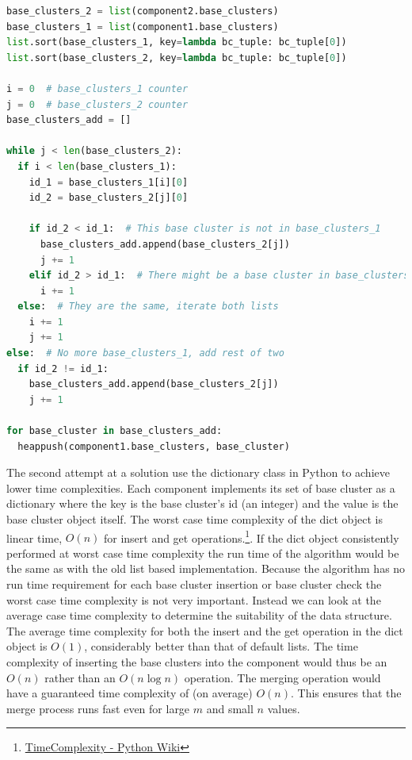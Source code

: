 \begin{lstlisting}[float=ht, language=python, breaklines=true, label=lst:simultaneousmerge, caption={Simultaneous merge of components.}] 
base_clusters_2 = list(component2.base_clusters)
base_clusters_1 = list(component1.base_clusters)
list.sort(base_clusters_1, key=lambda bc_tuple: bc_tuple[0])
list.sort(base_clusters_2, key=lambda bc_tuple: bc_tuple[0])

i = 0  # base_clusters_1 counter
j = 0  # base_clusters_2 counter
base_clusters_add = []

while j < len(base_clusters_2):
  if i < len(base_clusters_1):
    id_1 = base_clusters_1[i][0]
    id_2 = base_clusters_2[j][0]

    if id_2 < id_1:  # This base cluster is not in base_clusters_1
      base_clusters_add.append(base_clusters_2[j])
      j += 1
    elif id_2 > id_1:  # There might be a base cluster in base_clusters_1
      i += 1
  else:  # They are the same, iterate both lists
    i += 1
    j += 1
else:  # No more base_clusters_1, add rest of two
  if id_2 != id_1:
    base_clusters_add.append(base_clusters_2[j])
    j += 1

for base_cluster in base_clusters_add:
  heappush(component1.base_clusters, base_cluster)
\end{lstlisting}
   
The second attempt at a solution use the dictionary class in Python to achieve lower time complexities. Each component implements its set of base cluster as a dictionary where the key is the base cluster's id (an integer) and the value is the base cluster object itself. The worst case time complexity of the dict object is linear time, \(O(n)\) for insert and get operations.\footnote{\href{https://wiki.python.org/moin/TimeComplexity}{TimeComplexity - Python Wiki}}. If the dict object consistently performed at worst case time complexity the run time of the algorithm would be the same as with the old list based implementation. Because the algorithm has no run time requirement for each base cluster insertion or base cluster check the worst case time complexity is not very important. Instead we can look at the average case time complexity to determine the suitability of the data structure. The average time complexity for both the insert and the get operation in the dict object is \(O(1)\), considerably better than that of default lists. The time complexity of inserting the base clusters into the component would thus be an \(O(n)\) rather than an \(O(n \log n)\) operation. The merging operation would have a guaranteed time complexity of (on average) \(O(n)\). This ensures that the merge process runs fast even for large \(m\) and small \(n\) values.

